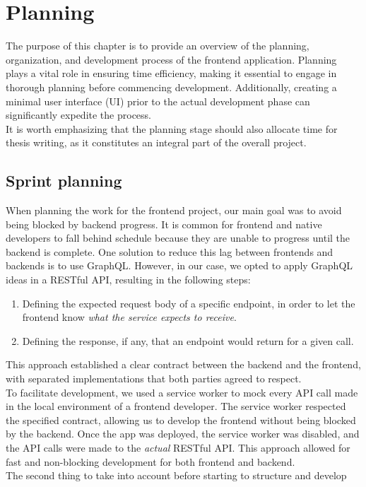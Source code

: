 \documentclass[../memory.tex]{subfiles}
\begin{document}
\chapter{Planning}
The purpose of this chapter is to provide an overview of the planning,
organization, and development process of the frontend application. Planning
plays a vital role in ensuring time efficiency, making it essential to engage in
thorough planning before commencing development. Additionally, creating a
minimal user interface (UI) prior to the actual development phase can
significantly expedite the process.
\\
It is worth emphasizing that the planning stage should also allocate time for
thesis writing, as it constitutes an integral part of the overall project.
\section{Sprint planning}
When planning the work for the frontend project, our main goal was to avoid
being blocked by backend progress. It is common for frontend and native
developers to fall behind schedule because they are unable to progress until the
backend is complete. One solution to reduce this lag between frontends and
backends is to use GraphQL. However, in our case, we opted to apply GraphQL
ideas in a RESTful API, resulting in the following steps:
\begin{enumerate}[label = -]
	\item Defining the expected request body of a specific endpoint, in order to
	      let the frontend know \emph{what the service expects to receive}.
	\item Defining the response, if any, that an endpoint would return for a given call.
\end{enumerate}
This approach established a clear contract between the backend and the frontend,
with separated implementations that both parties agreed to respect.
\\
To facilitate development, we used a service worker to mock every API call made
in the local environment of a frontend developer. The service worker respected
the specified contract, allowing us to develop the frontend without being
blocked by the backend. Once the app was deployed, the service worker was
disabled, and the API calls were made to the \emph{actual} RESTful API. This
approach allowed for fast and non-blocking development for both frontend and
backend.
\\[8pt]
The second thing to take into account before starting to structure and develop
\end{document}
